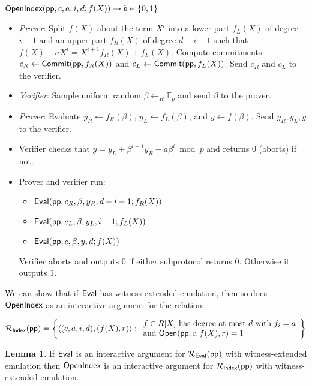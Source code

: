\documentclass{article}
\theoremstyle{definition}
\newtheorem{lemma}{Lemma}
\begin{document}
$\textsf{{OpenIndex}}(\textsf{pp}, c, a, i, d; f(X)) \rightarrow b \in \{0,1\}$
\begin{itemize}

\item \emph{Prover}: Split $f(X)$ about the term $X^i$ into a lower part $f_L(X)$ of degree $i -1$ and an upper part $f_R(X)$ of degree $d - i - 1$ such that $f(X) - a X^i = X^{i+1} f_R(X) + f_L(X)$. Compute commitments $c_R \leftarrow \textsf{{Commit}}(\textsf{pp}, f_R(X))$ and $c_L \leftarrow \textsf{{Commit}}(\textsf{pp}, f_L(X))$. Send $c_R$ and $c_L$ to the verifier. 

\item \emph{Verifier}: Sample uniform random  $\beta \leftarrow_R \mathbb{F}_p$ and send $\beta$ to the prover.

\item \emph{Prover}: Evaluate $y_R \leftarrow f_R(\beta)$, $y_L \leftarrow f_L(\beta)$, and $y \leftarrow f(\beta)$. Send $y_R, y_L, y$ to the verifier. 

\item Verifier checks that $y = y_L + \beta^{i+1} y_R - a \beta^i \bmod p$ and returns $0$ (aborts) if not.

\item Prover and verifier run: 
\begin {itemize} 
\item  $\textsf{{Eval}}(\textsf{pp}, c_R, \beta, y_R, d - i -1; f_R(X))$ 
\item $\textsf{{Eval}}(\textsf{pp}, c_L, \beta, y_L, i -1; f_L(X))$ 
\item $\textsf{{Eval}}(\textsf{pp}, c, \beta, y, d; f(X))$
\end{itemize} 
Verifier aborts and outputs $0$ if either subprotocol returns $0$. Otherwise it outputs $1$. 

\end{itemize}

We can show that if $\textsf{{Eval}}$ has witness-extended emulation, then so does $\textsf{{OpenIndex}}$ as an interactive argument for the relation: 

\[ 
\mathcal{R_\textsf{Index}}(\textsf{pp}) = \left\{
\langle (c, a, i, d), (f(X), r) \rangle
: 
\begin{array}{l} 
f \in R[X] \ \text{has degree at most} \ d \ \text{with} \ f_i = a \\ 
 \text{and} \ \textsf{{Open}}(\textsf{pp}, c, f(X), r) = 1 \\
\end{array}
\right\}
\] 


\begin{lemma} 
If $\textsf{{Eval}}$ is an interactive argument for $\mathcal{R_\textsf{Eval}}(\textsf{pp})$ with witness-extended emulation then $\textsf{{OpenIndex}}$ is an interactive argument for $\mathcal{R_\textsf{Index}}(\textsf{pp})$ with witness-extended emulation. 
\end{lemma}
\end{document}

